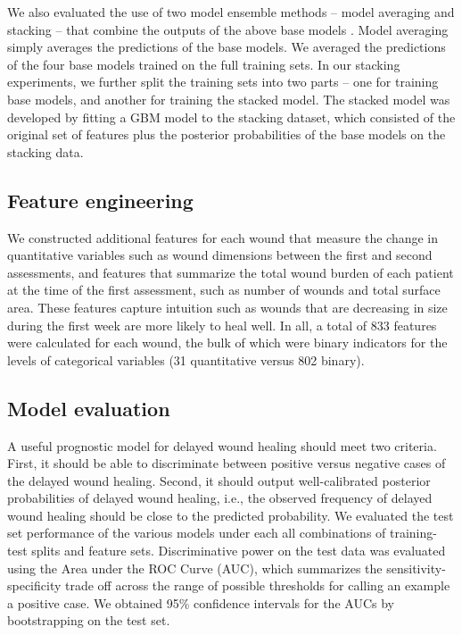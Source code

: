 We also evaluated the use of two model ensemble methods – model
averaging and stacking – that combine the outputs of the above base
models \cite{Wolpert1992,Ting1999}.  Model averaging simply averages
the predictions of the base models.  We averaged the predictions of
the four base models trained on the full training sets.  In our
stacking experiments, we further split the training sets into two
parts – one for training base models, and another for training the
stacked model.  The stacked model was developed by fitting a GBM model
to the stacking dataset, which consisted of the original set of
features plus the posterior probabilities of the base models on the
stacking data.  

\subsection{Feature engineering}
We constructed additional features for each wound that measure the
change in quantitative variables such as wound dimensions between the
first and second assessments, and features that summarize the total
wound burden of each patient at the time of the first assessment, such
as number of wounds and total surface area. These features capture
intuition such as wounds that are decreasing in size during the first
week are more likely to heal well.  In all, a total of 833 features
were calculated for each wound, the bulk of which were binary
indicators for the levels of categorical variables (31 quantitative
versus 802 binary).

\subsection{Model evaluation}
A useful prognostic model for delayed wound healing should meet two
criteria.  First, it should be able to discriminate between positive
versus negative cases of the delayed wound healing.  Second, it should
output well-calibrated posterior probabilities of delayed wound
healing, i.e., the observed frequency of delayed wound healing should
be close to the predicted probability.  We evaluated the test set
performance of the various models under each all combinations of
training-test splits and feature sets.  Discriminative power on the
test data was evaluated using the Area under the ROC Curve (AUC),
which summarizes the sensitivity-specificity trade off across the
range of possible thresholds for calling an example a positive case.
We obtained 95\% confidence intervals for the AUCs by bootstrapping on
the test set.

